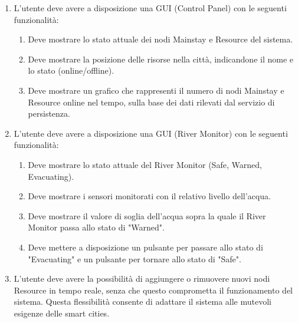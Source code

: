 \documentclass[12pt]{article}
\begin{document}
\begin{enumerate}
    \item L'utente deve avere a disposizione una GUI (Control Panel) con le seguenti funzionalità:
          \begin{enumerate}
              \item Deve mostrare lo stato attuale dei nodi Mainstay e Resource del sistema.
              \item Deve mostrare la posizione delle risorse nella città, indicandone il nome e lo stato (online/offline).
              \item Deve mostrare un grafico che rappresenti il numero di nodi Mainstay e Resource online nel tempo, sulla base dei dati rilevati
                    dal servizio di persistenza.
          \end{enumerate}
    \item L'utente deve avere a disposizione una GUI (River Monitor) con le seguenti funzionalità:
          \begin{enumerate}
              \item Deve mostrare lo stato attuale del River Monitor (Safe, Warned, Evacuating).
              \item Deve mostrare i sensori monitorati con il relativo livello dell'acqua.
              \item Deve mostrare il valore di soglia dell'acqua sopra la quale il River Monitor passa allo stato di "Warned".
              \item Deve mettere a disposizione un pulsante per passare allo stato di "Evacuating" e un pulsante per tornare allo stato di "Safe".
          \end{enumerate}
    \item L'utente deve avere la possibilità di aggiungere o rimuovere nuovi nodi Resource in tempo reale, senza che questo comprometta il funzionamento del sistema. Questa flessibilità consente di adattare il sistema alle mutevoli esigenze delle smart cities.
\end{enumerate}
\end{document}
